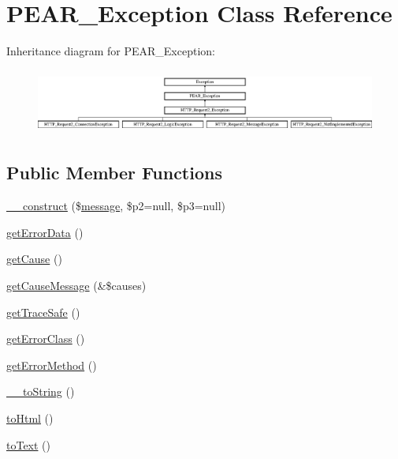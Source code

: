 \hypertarget{classPEAR__Exception}{}\section{P\+E\+A\+R\+\_\+\+Exception Class Reference}
\label{classPEAR__Exception}
Inheritance diagram for P\+E\+A\+R\+\_\+\+Exception\+:\begin{figure}[H]
\begin{center}
\leavevmode
\includegraphics[height=2.162162cm]{classPEAR__Exception}
\end{center}
\end{figure}
\subsection*{Public Member Functions}
\begin{DoxyCompactItemize}
\item 
\hyperlink{classPEAR__Exception_a7cecb146f11821bcd31ef8317c9a2ce9}{\+\_\+\+\_\+construct} (\$\hyperlink{classmessage}{message}, \$p2=null, \$p3=null)
\item 
\hyperlink{classPEAR__Exception_a705ea5e6f32355245137f979221bf5c2}{get\+Error\+Data} ()
\item 
\hyperlink{classPEAR__Exception_abc2aa18bf5cf14ab29e01d14eed7e041}{get\+Cause} ()
\item 
\hyperlink{classPEAR__Exception_a1c16ee57f4091d424c1bbcd904dda4f4}{get\+Cause\+Message} (\&\$causes)
\item 
\hyperlink{classPEAR__Exception_a6ddfe3065ec2af986b3e3fe267198515}{get\+Trace\+Safe} ()
\item 
\hyperlink{classPEAR__Exception_a747dd232565b7e07ec7ef55e46405f4e}{get\+Error\+Class} ()
\item 
\hyperlink{classPEAR__Exception_a423d0dcd3d908d2a39068a0893d17f22}{get\+Error\+Method} ()
\item 
\hyperlink{classPEAR__Exception_ab02a3b6f2be2f5b639cba45b007f7b7a}{\+\_\+\+\_\+to\+String} ()
\item 
\hyperlink{classPEAR__Exception_ab69d689242e40974b2675cf25aa68068}{to\+Html} ()
\item 
\hyperlink{classPEAR__Exception_ad3b5a0285226613b02b1730b2d632bd1}{to\+Text} ()
\end{DoxyCompactItemize}
